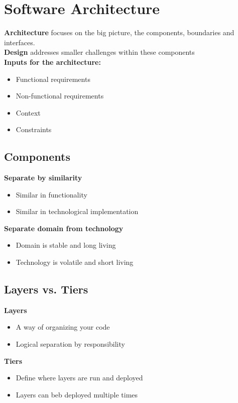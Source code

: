 
\section{Software Architecture}
\textbf{Architecture} focuses on the big picture, the components, boundaries and interfaces.\\
\textbf{Design} addresses smaller challenges within these components\\
\textbf{Inputs for the architecture:}
\begin{itemize}
    \item Functional requirements
    \item Non-functional requirements
    \item Context
    \item Constraints
\end{itemize}

\subsection{Components}
\textbf{Separate by similarity}
\begin{itemize}
    \item Similar in functionality
    \item Similar in technological implementation
\end{itemize}
\textbf{Separate domain from technology}
\begin{itemize}
    \item Domain is stable and long living
    \item Technology is volatile and short living
\end{itemize}

\subsection{Layers vs. Tiers}
\textbf{Layers}
\begin{itemize}
    \item A way of organizing your code
    \item Logical separation by responsibility
\end{itemize}
\textbf{Tiers}
\begin{itemize}
    \item Define where layers are run and deployed
    \item Layers can beb deployed multiple times
\end{itemize}

